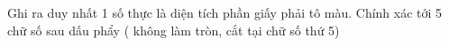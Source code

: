 Ghi ra duy nhất 1 số thực là diện tích phần giấy phải tô màu. Chính xác tới 5 chữ số sau dấu phẩy ( không làm tròn, cắt tại chữ số thứ 5)  

\